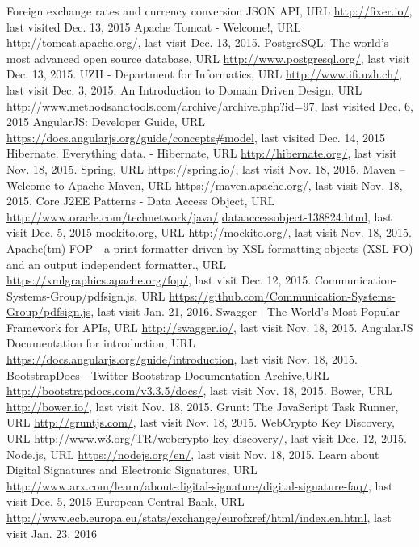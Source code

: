 \begin{thebibliography}{99}

 Foreign exchange rates and currency conversion JSON API, URL \url{http://fixer.io/}, last visited Dec. 13, 2015
 Apache Tomcat - Welcome!, URL \url{http://tomcat.apache.org/}, last visit Dec. 13, 2015.
 PostgreSQL: The world's most advanced open source database, URL \url{http://www.postgresql.org/}, last visit Dec. 13, 2015.
 UZH - Department for Informatics, URL \url{http://www.ifi.uzh.ch/}, last visit Dec. 3, 2015.
 An Introduction to Domain Driven Design, URL \url{http://www.methodsandtools.com/archive/archive.php?id=97}, last visited Dec. 6, 2015
 AngularJS: Developer Guide, \newline URL \url{https://docs.angularjs.org/guide/concepts#model}, last visited Dec. 14, 2015
 Hibernate. Everything data. - Hibernate, URL \url{http://hibernate.org/}, last visit Nov. 18, 2015.
 Spring, URL \url{https://spring.io/}, last visit Nov. 18, 2015.
 Maven – Welcome to Apache Maven, URL \url{https://maven.apache.org/}, last visit Nov. 18, 2015.
 Core J2EE Patterns - Data Access Object, \newline URL \url{http://www.oracle.com/technetwork/java/} \newline \url{dataaccessobject-138824.html}, last visit Dec. 5, 2015
 mockito.org, URL \url{http://mockito.org/}, last visit Nov. 18, 2015.
 Apache(tm) FOP - a print formatter driven by XSL formatting objects (XSL-FO) and an output independent formatter., URL \url{https://xmlgraphics.apache.org/fop/}, last visit Dec. 12, 2015.
 Communication-Systems-Group/pdfsign.js, \newline URL \url{https://github.com/Communication-Systems-Group/pdfsign.js}, last visit Jan. 21, 2016.
 Swagger | The World's Most Popular Framework for APIs, URL \url{http://swagger.io/}, last visit Nov. 18, 2015.
 AngularJS Documentation for introduction, URL \url{https://docs.angularjs.org/guide/introduction}, last visit Nov. 18, 2015.
 BootstrapDocs - Twitter Bootstrap Documentation Archive,\newline URL \url{http://bootstrapdocs.com/v3.3.5/docs/}, last visit Nov. 18, 2015.
 Bower, URL \url{http://bower.io/}, last visit Nov. 18, 2015.
 Grunt: The JavaScript Task Runner, URL \url{http://gruntjs.com/}, last visit Nov. 18, 2015.
 WebCrypto Key Discovery, \newline URL \url{http://www.w3.org/TR/webcrypto-key-discovery/}, last visit Dec. 12, 2015.
 Node.js, URL \url{https://nodejs.org/en/}, last visit Nov. 18, 2015.
 Learn about Digital Signatures and Electronic Signatures, URL \url{http://www.arx.com/learn/about-digital-signature/digital-signature-faq/}, last visit Dec. 5, 2015
 European Central Bank, URL
\url{http://www.ecb.europa.eu/stats/exchange/eurofxref/html/index.en.html}, last visit Jan. 23, 2016


\end{thebibliography}
